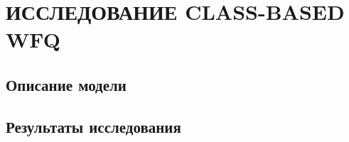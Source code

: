 \section{ИССЛЕДОВАНИЕ CLASS-BASED WFQ}

	\subsection{Описание модели}

	\subsection{Результаты исследования}

